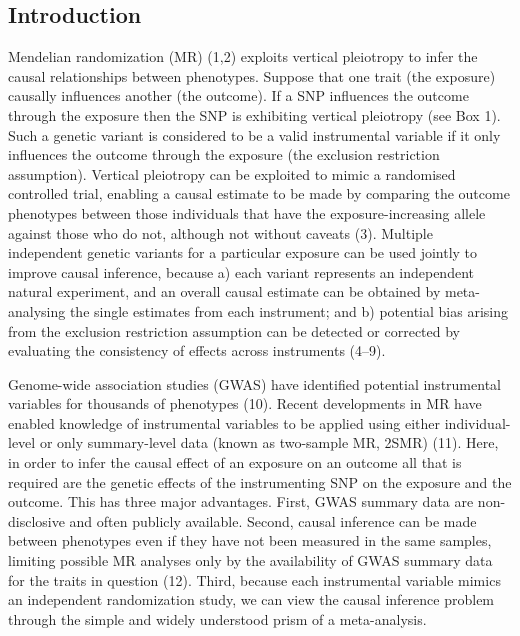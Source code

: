 \documentclass[]{article}
\begin{document}
\subsection{Introduction}\label{introduction}

Mendelian randomization (MR) (1,2) exploits vertical pleiotropy to infer
the causal relationships between phenotypes. Suppose that one trait (the
exposure) causally influences another (the outcome). If a SNP influences
the outcome through the exposure then the SNP is exhibiting vertical
pleiotropy (see Box 1). Such a genetic variant is considered to be a
valid instrumental variable if it only influences the outcome through
the exposure (the exclusion restriction assumption). Vertical pleiotropy
can be exploited to mimic a randomised controlled trial, enabling a
causal estimate to be made by comparing the outcome phenotypes between
those individuals that have the exposure-increasing allele against those
who do not, although not without caveats (3). Multiple independent
genetic variants for a particular exposure can be used jointly to
improve causal inference, because a) each variant represents an
independent natural experiment, and an overall causal estimate can be
obtained by meta-analysing the single estimates from each instrument;
and b) potential bias arising from the exclusion restriction assumption
can be detected or corrected by evaluating the consistency of effects
across instruments (4--9).

Genome-wide association studies (GWAS) have identified potential
instrumental variables for thousands of phenotypes (10). Recent
developments in MR have enabled knowledge of instrumental variables to
be applied using either individual-level or only summary-level data
(known as two-sample MR, 2SMR) (11). Here, in order to infer the causal
effect of an exposure on an outcome all that is required are the genetic
effects of the instrumenting SNP on the exposure and the outcome. This
has three major advantages. First, GWAS summary data are non-disclosive
and often publicly available. Second, causal inference can be made
between phenotypes even if they have not been measured in the same
samples, limiting possible MR analyses only by the availability of GWAS
summary data for the traits in question (12). Third, because each
instrumental variable mimics an independent randomization study, we can
view the causal inference problem through the simple and widely
understood prism of a meta-analysis.
\end{document}
